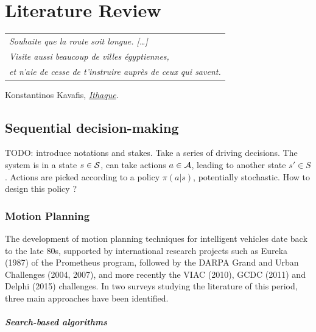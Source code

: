 
\graphicspath{{2-Chapters/2-Chapter/}}

\chapter{Literature Review}
\label{chapter:2}

\begin{flushright}
	\begin{tabular}{@{}l@{}}
		\emph{Souhaite que la route soit longue. [\dots]}\\
		\emph{Visite aussi beaucoup de villes égyptiennes,}\\
		\emph{et n’aie de cesse de t’instruire auprès de ceux qui savent.}\\
	\end{tabular}
	
	Konstantinos Kavafis, \href{https://eleurent.github.io/sisyphe/texts/ithaki.html}{\emph{Ithaque}}.
\end{flushright}

\section{Sequential decision-making}
\label{sec:sequential-decision-making}

TODO: introduce notations and stakes. Take a series of driving decisions. The system is in a state $s\in\mathcal{S}$, can take actions $a\in\mathcal{A}$, leading to another state $s'\in S$. Actions are picked according to a policy $\pi(a|s)$, potentially stochastic. How to design this policy ?

\subsection{Motion Planning}

The development of motion planning techniques for intelligent vehicles date back to the late 80s, supported by international research projects such as Eureka (1987) of the Prometheus program, followed by the DARPA Grand and Urban Challenges (2004, 2007), and more recently the VIAC (2010), GCDC (2011) and Delphi (2015) challenges. In two surveys \citep{Gonzalez2016,Paden2016} studying the literature of this period, three main approaches have been identified.

\paragraph{Search-based algorithms}

